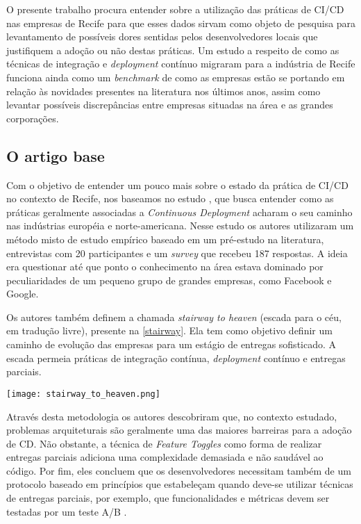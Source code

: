 O presente trabalho procura entender sobre a utilização das práticas de CI/CD nas empresas de Recife para que esses dados sirvam como objeto de pesquisa para levantamento de possíveis dores sentidas pelos desenvolvedores locais que justifiquem a adoção ou não destas práticas. Um estudo a respeito de como as técnicas de integração e \emph{deployment} contínuo migraram para a indústria de Recife funciona ainda como um \emph{benchmark} de como as empresas estão se portando em relação às novidades presentes na literatura nos últimos anos, assim como levantar possíveis discrepâncias entre empresas situadas na área e as grandes corporações. 


\subsection{O artigo base}
Com o objetivo de entender um pouco mais sobre o estado da prática de CI/CD no contexto de Recife, nos baseamos no estudo \cite{empiricalStudy2016}, que busca entender como as práticas geralmente associadas a \emph{Continuous Deployment} acharam o seu caminho nas indústrias européia e norte-americana. Nesse estudo os autores utilizaram um método misto de estudo empírico baseado em um pré-estudo na literatura, entrevistas com 20 participantes e um \emph{survey} que recebeu 187 respostas. A ideia era questionar até que ponto o conhecimento na área estava dominado por peculiaridades de um pequeno grupo de grandes empresas, como Facebook e Google.

Os autores também definem a chamada \emph{stairway to heaven} (escada para o céu, em tradução livre), presente na \ref{stairway}. Ela tem como objetivo definir um caminho de evolução das empresas para um estágio de entregas sofisticado. A escada permeia práticas de integração contínua, \emph{deployment} contínuo e entregas parciais.

\begin{figure*}
\texttt{[image: stairway\_to\_heaven.png]}
\caption[Stairway to Heaven]{
    A escada de evolução denominada \emph{Stairway to Heaven} proposta pelo artigo base.
    Fonte: Schermman et al \cite{empiricalStudy2016}
}\label{stairway}

\end{figure*}

Através desta metodologia os autores descobriram que, no contexto estudado, problemas arquiteturais são geralmente uma das maiores barreiras para a adoção de CD. Não obstante, a técnica de \emph{Feature Toggles} \cite{featureToggles} como forma de realizar entregas parciais adiciona uma complexidade demasiada e não saudável ao código. Por fim, eles concluem que os desenvolvedores necessitam também de um protocolo baseado em princípios que estabeleçam quando deve-se utilizar técnicas de entregas parciais, por exemplo, que funcionalidades e métricas devem ser testadas por um teste A/B \cite{testsAB}.

